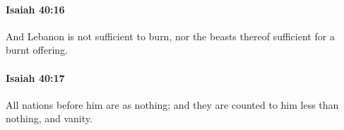 		\paragraph{Isaiah 40:16} %
			\label{ISAIAH-40-16}

			And Lebanon is not sufficient to burn, nor the beasts thereof sufficient for a burnt offering.


		\paragraph{Isaiah 40:17} %
			\label{ISAIAH-40-17}

			All nations before him are as nothing; and they are counted to him less than nothing, and vanity.


